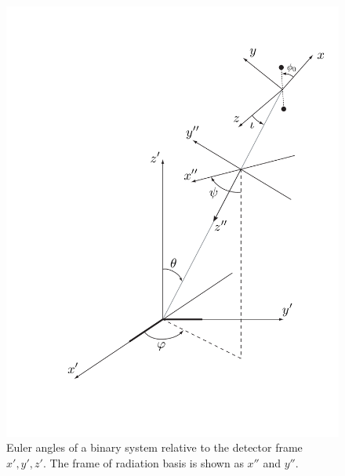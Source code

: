 \begin{figure}[p]
\begin{center}
\includegraphics[width=\linewidth]{figures/inspiral/euler}
\end{center}
\caption[Coordinates Used to Describe the Response of a Gravitational Wave Interferometer]{%
\label{f:euler}
Euler angles of a binary system relative to the detector frame $x',y',z'$. The
frame of radiation basis is shown as $x''$ and $y''$.
}
\end{figure}

